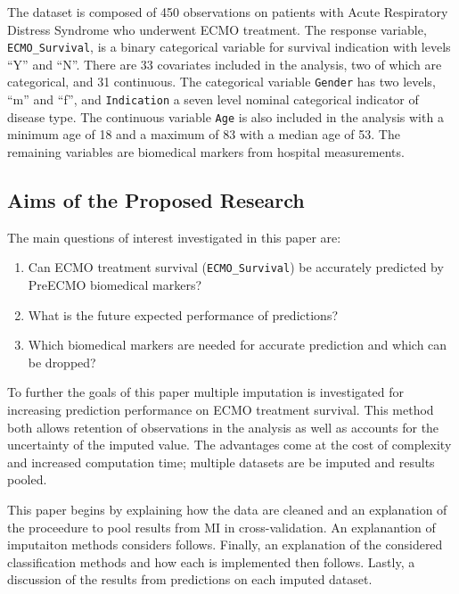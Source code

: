 \documentclass[12pt,]{article}
\providecommand{\tightlist}{%
  \setlength{\itemsep}{0pt}\setlength{\parskip}{0pt}}
\begin{document}
The dataset is composed of 450 observations on patients with Acute
Respiratory Distress Syndrome who underwent ECMO treatment. The response
variable, \texttt{ECMO\_Survival}, is a binary categorical variable for
survival indication with levels ``Y'' and ``N''. There are 33 covariates
included in the analysis, two of which are categorical, and 31
continuous. The categorical variable \texttt{Gender} has two levels,
``m'' and ``f'', and \texttt{Indication} a seven level nominal
categorical indicator of disease type. The continuous variable
\texttt{Age} is also included in the analysis with a minimum age of 18
and a maximum of 83 with a median age of 53. The remaining variables are
biomedical markers from hospital measurements.

\subsection{Aims of the Proposed
Research}\label{aims-of-the-proposed-research}

The main questions of interest investigated in this paper are:

\begin{enumerate}
\def\labelenumi{\arabic{enumi}.}
\tightlist
\item
  Can ECMO treatment survival (\texttt{ECMO\_Survival}) be accurately
  predicted by PreECMO biomedical markers?
\item
  What is the future expected performance of predictions?
\item
  Which biomedical markers are needed for accurate prediction and which
  can be dropped?
\end{enumerate}

To further the goals of this paper multiple imputation is investigated
for increasing prediction performance on ECMO treatment survival. This
method both allows retention of observations in the analysis as well as
accounts for the uncertainty of the imputed value. The advantages come
at the cost of complexity and increased computation time; multiple
datasets are be imputed and results pooled.

This paper begins by explaining how the data are cleaned and an
explanation of the proceedure to pool results from MI in
cross-validation. An explanantion of imputaiton methods considers
follows. Finally, an explanation of the considered classification
methods and how each is implemented then follows. Lastly, a discussion
of the results from predictions on each imputed dataset.
\end{document}
